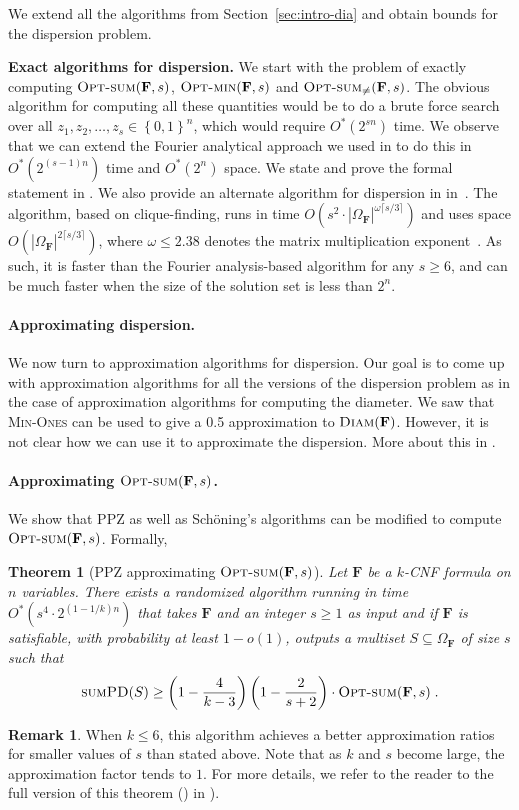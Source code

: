 \documentclass[11pt, letterpaper]{article}
\newtheorem{theorem}{Theorem}
\theoremstyle{definition}
\newtheorem{remark}{Remark}
\newcommand{\set}[1]{\left \{ #1 \right \}}
\newcommand{\size}[1]{\ensuremath{\left|#1\right|}}
\newcommand{\f}{\mathbf{F}}
\newcommand{\Om}{\Omega_{\f}}
\newcommand{\minones}{\textsc{Min-Ones}\xspace}
\newcommand{\SPD}{\textsc{sumPD}}
\newcommand{\opts}{\textsc{Opt-sum}}
\newcommand{\optm}{\textsc{Opt-min}}
\newcommand{\D}{\textsc{Diam}}
\newcommand{\sch}{Sch\"{o}ning\xspace}
\begin{document}
We extend all the algorithms from Section~\ref{sec:intro-dia} and obtain bounds for the dispersion problem. 


\medskip\noindent
\textbf{Exact algorithms for dispersion.}
We start with the problem of exactly computing $\opts(\f,s)$, $\optm(\f,s)$ and $\opts_{\neq}(\f,s)$. The obvious algorithm for computing all these quantities would be to do a brute force search over all $z_1, z_2, \dots, z_s \in \set{0,1}^n$, which would require $O^*(2^{sn})$ time. We observe that we can extend the Fourier analytical approach we used in  to do this in $O^*(2^{(s-1)n})$ time and $O^*(2^n)$ space.  We state and prove the formal statement in . We also provide an alternate  algorithm for dispersion in  in~. The algorithm, based on clique-finding, runs in time $O(s^2 \cdot \size{\Om}^{\omega \lceil s/3 \rceil})$ and uses space  $O(\size{\Om}^{2 \lceil s/3 \rceil})$, where $\omega \le 2.38$ denotes the matrix multiplication exponent~\cite{williams2024new}. As such, it is faster than the Fourier analysis-based algorithm for any $s\geq 6$, and can be much faster when the size of the solution set is less than $2^{n}$.


\medskip\noindent
\paragraph{Approximating dispersion.} We now turn to approximation algorithms for dispersion. Our goal is to come up with approximation algorithms for all the versions of the dispersion problem as in the case of approximation algorithms for computing the diameter. We saw that \minones can be used to give a 0.5 approximation to $\D(\f)$. However, it is not clear how we can use it to approximate the dispersion. More about this in . 

\paragraph{Approximating $\opts(\f, s)$. } We show that PPZ as well as \sch's algorithms can be modified to compute $\opts(\f,s)$. Formally, 
\begin{theorem}[PPZ approximating $\opts(\f,s)$] \label{thm:ppz-for-sumdisp-easy}
    Let $\f$ be a $k$-CNF formula on $n$ variables. There exists a randomized algorithm running in time $O^*\left(s^4 \cdot 2^{(1-1/k)n}\right)$ that takes $\f$ and an integer $s \geq 1$ as input and if $\f$ is satisfiable, with probability at least $1-o(1)$, outputs a multiset $S \subseteq \Om$ of size $s$ such that $$\SPD(S) \geq \left(1-\frac{4}{k-3}\right)\left(1-\frac{2}{s+2}\right)\cdot \opts(\f,s) \; .$$
\end{theorem}
\begin{remark}
    When $k \leq 6$, this algorithm achieves a better approximation ratios for smaller values of $s$ than stated above. Note that as $k$ and $s$ become large, the approximation factor tends to $1$. For more details, we refer to the reader to the full version of this theorem () in ). 
\end{remark}
\end{document}
